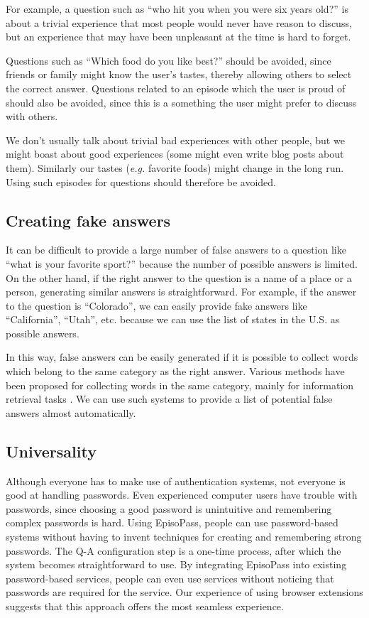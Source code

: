 \documentclass[runningheads,a4paper]{llncs}
\begin{document}
For example, a question such as
``who hit you when you were six years old?''
is about a trivial experience that most people would never have reason to discuss,
but an experience that may have been unpleasant at the time is hard to forget.

Questions such as ``Which food do you like best?'' should be avoided,
since friends or family might know the user's tastes, thereby allowing 
others to select the correct answer.
Questions related to an episode which the user is proud of should also be
avoided, since this is a something the user might prefer to discuss with others.

We don't usually talk about trivial bad experiences with other people,
but we might boast about good experiences (some might even write blog posts about them).
Similarly our tastes ({\it e.g.\/} favorite foods) might change in the long run.
Using such episodes for questions should therefore be avoided.

\subsection{Creating fake answers}

It can be difficult to provide a large number of false answers to a question like
``what is your favorite sport?''
because the number of possible answers is limited.
%
On the other hand, if the right answer to the question is a name of a place or a person,
generating similar answers is straightforward.
For example, if the answer to the question is ``Colorado'',
we can easily provide fake answers like ``California'', ``Utah'', etc.
because we can use the list of states in the U.S. as possible answers.

In this way, false answers can be easily generated
if it is possible to collect words which belong to the same
category as the right answer.
%
Various methods have been proposed for collecting words in the
same category, mainly for information retrieval tasks
\cite{Huang:2012:LFC:2426725.2426728,BooWa,Wang:2007:LSE:1441428.1442086}. %
We can use such systems to provide a list of potential false answers almost automatically.

\subsection{Universality}

Although everyone has to make use of authentication systems, not everyone
is good at handling passwords.
Even experienced computer users have trouble with passwords,
since choosing a good password is unintuitive and remembering complex
passwords is hard.
%
Using EpisoPass, people can use password-based systems without having to invent
techniques for creating and remembering strong passwords. The Q-A configuration step
is a one-time process, after which the system becomes straightforward to use.
%
By integrating EpisoPass into existing password-based services,
people can even use services without noticing that passwords are
required for the service.
%
Our experience of using browser extensions suggests that
this approach offers the most seamless experience.
\end{document}
